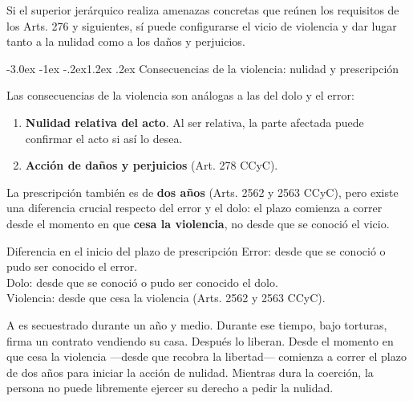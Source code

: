 \documentclass[12pt,oneside]{book}
\makeatletter
\renewcommand\section{\@startsection{section}{1}{\z@}%
  {-3.0ex \@plus -1ex \@minus -.2ex}{1.2ex \@plus .2ex}%
  {\normalfont\large\bfseries\color{acento}}}
\makeatother
\begin{document}
\begin{nota}
Si el superior jerárquico realiza amenazas concretas que reúnen los requisitos de los Arts. 276 y siguientes, sí puede configurarse el vicio de violencia y dar lugar tanto a la nulidad como a los daños y perjuicios.
\end{nota}

\section{Consecuencias de la violencia: nulidad y prescripción}

Las consecuencias de la violencia son análogas a las del dolo y el error:

\begin{enumerate}
    \item \textbf{Nulidad relativa del acto}. Al ser relativa, la parte afectada puede confirmar el acto si así lo desea.
    \item \textbf{Acción de daños y perjuicios} (Art. 278 CCyC).
\end{enumerate}

La prescripción también es de \textbf{dos años} (Arts. 2562 y 2563 CCyC), pero existe una diferencia crucial respecto del error y el dolo: el plazo comienza a correr desde el momento en que \textbf{cesa la violencia}, no desde que se conoció el vicio.

\begin{articulo}{Diferencia en el inicio del plazo de prescripción}
Error: desde que se conoció o pudo ser conocido el error.\\
Dolo: desde que se conoció o pudo ser conocido el dolo.\\
Violencia: desde que cesa la violencia (Arts. 2562 y 2563 CCyC).
\end{articulo}

\begin{ejemplo}
A es secuestrado durante un año y medio. Durante ese tiempo, bajo torturas, firma un contrato vendiendo su casa. Después lo liberan. Desde el momento en que cesa la violencia ---desde que recobra la libertad--- comienza a correr el plazo de dos años para iniciar la acción de nulidad. Mientras dura la coerción, la persona no puede libremente ejercer su derecho a pedir la nulidad.
\end{ejemplo}

\end{document}
